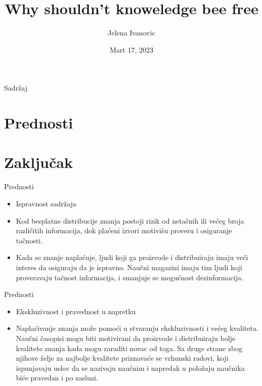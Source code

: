 \documentclass[11pt]{beamer}
\author{Jelena Ivanovic}
\title{ Why shouldn't knoweledge bee free}
\institute[]{Matematički fakultet, Beograd\\Predmet: Računarstvo i društvo\\ Profesor: Dr. Sana Stojanović Đurđević}
\date{Mart 17, 2023}
\begin{document}
\begin{frame}
\titlepage
\end{frame}

\begin{frame}{Sadržaj}
\tableofcontents 
\end{frame}

\section{Prednosti}
\section{Zaključak}


\begin{frame}{Prednosti}
        \begin{itemize}
            \item Ispravnost sadržaja
            \item Kod besplatne distribucije znanja postoji rizik od netačnih ili većeg broja različitih informacija, dok plaćeni izvori motivišu proveru i osiguranje tačnosti. 
            \item Kada se znanje naplaćuje, ljudi koji ga proizvode i distribuiraju imaju veći interes da osiguraju da je ispravno. Naučni magazini imaju tim ljudi koji proveravaju tačnost informacija, i smanjuje se mogućnost dezinformacija.
        \end{itemize}
       
\end{frame}

\begin{frame}{Prednosti}
        \begin{itemize}
        \item Ekskluzivnost i pravednost u napretku
        \item Naplaćivanje znanja može pomoći u stvaranju ekskluzivnosti i većeg kvaliteta. Naučni časopisi mogu biti motivirani da proizvode i distribuiraju bolje kvalitete znanja kada mogu zaraditi novac od toga. Sa druge strane zbog njihove želje za najbolje kvalitete priznavaće se vrhunski radovi, koji ispunjavaju uslov da se nazivaju naučnim  i napredak u položaju naučnika biće pravedan i po zasluzi.

        \end{itemize}
       
\end{frame}
\end{document}
